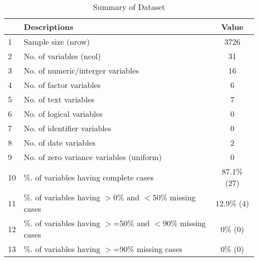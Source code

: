\begin{table}[ht]
\centering
\caption{Summary of Dataset} 
\begin{tabular}{llc}
  \hline
 & Descriptions & Value \\ 
  \hline
1 & Sample size (nrow) & 3726 \\ 
  2 & No. of variables (ncol) & 31 \\ 
  3 & No. of numeric/interger variables & 16 \\ 
  4 & No. of factor variables & 6 \\ 
  5 & No. of text variables & 7 \\ 
  6 & No. of logical variables & 0 \\ 
  7 & No. of identifier variables & 0 \\ 
  8 & No. of date variables & 2 \\ 
  9 & No. of zero variance variables (uniform) & 0 \\ 
  10 & \%. of variables having complete cases & 87.1\% (27) \\ 
  11 & \%. of variables having $>$0\% and $<$50\% missing cases & 12.9\% (4) \\ 
  12 & \%. of variables having $>$=50\% and $<$90\% missing cases & 0\% (0) \\ 
  13 & \%. of variables having $>$=90\% missing cases & 0\% (0) \\ 
   \hline
\end{tabular}
\end{table}
